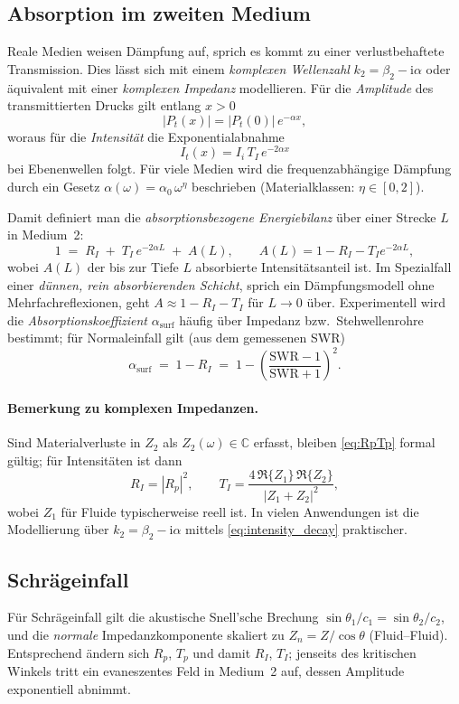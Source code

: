 \subsection{Absorption im zweiten Medium}
Reale Medien weisen Dämpfung auf, sprich es kommt zu einer verlustbehaftete Transmission.
Dies lässt sich mit einem \emph{komplexen Wellenzahl}
\(
    k_2 = \beta_2 - \mathrm{i}\alpha
\)
oder äquivalent mit einer \emph{komplexen Impedanz} modellieren.
Für die \emph{Amplitude} des transmittierten Drucks gilt entlang $x>0$
\[
    |P_t(x)| = |P_t(0)|\,e^{-\alpha x},
\]
woraus für die \emph{Intensität} die Exponentialabnahme
\begin{equation}
    I_t(x)=I_i\,T_I\,e^{-2\alpha x}
    \label{eq:intensity_decay}
\end{equation}
bei Ebenenwellen folgt.
Für viele Medien wird die frequenzabhängige Dämpfung durch ein Gesetz
$\alpha(\omega)=\alpha_0\,\omega^\eta$ beschrieben (Materialklassen: $\eta\in[0,2]$).
\cite{schall:allenAbsorption}

Damit definiert man die \emph{absorptionsbezogene Energiebilanz} über einer Strecke $L$ in Medium~2:
\begin{equation}
    1 \;=\; R_I \;+\; T_I\,e^{-2\alpha L} \;+\; A(L),
    \qquad
    A(L)=1-R_I - T_I e^{-2\alpha L},
    \label{eq:absorption_balance}
\end{equation}
wobei $A(L)$ der bis zur Tiefe $L$ absorbierte Intensitätsanteil ist.
Im Spezialfall einer \emph{dünnen, rein absorbierenden Schicht}, sprich ein Dämpfungs\-modell ohne Mehrfachreflexionen, geht $A \approx 1-R_I-T_I$ für $L\to0$ über.
Experimentell wird die \emph{Absorptionskoeffizient} $\alpha_\mathrm{surf}$ häufig über Impedanz\- bzw.\ Stehwellen\-rohre bestimmt; für Normal\-einfall gilt (aus dem gemessenen SWR)
\begin{equation}
    \alpha_\mathrm{surf} \;=\; 1 - R_I \;=\; 1 - \left(\frac{\mathrm{SWR}-1}{\mathrm{SWR}+1}\right)^2.
    \label{eq:alpha_SWR}
\end{equation}

\paragraph{Bemerkung zu komplexen Impedanzen.}
Sind Materialverluste in $Z_2$ als $Z_2(\omega)\in\mathbb{C}$ erfasst, bleiben \eqref{eq:RpTp} formal gültig; für Intensitäten ist dann
\[
    R_I=\left|R_p\right|^2,\qquad
    T_I=\frac{4\,\Re\{Z_1\}\,\Re\{Z_2\}}{|Z_1+Z_2|^2},
\]
wobei $Z_1$ für Fluide typischerweise reell ist.
In vielen Anwendungen ist die Modellierung über $k_2=\beta_2-\mathrm{i}\alpha$ mittels \eqref{eq:intensity_decay} praktischer.%
\cite{schall:kinsler,schall:allenRT}

\subsection{Schräg\-einfall}
Für Schräg\-einfall gilt die akustische Snell'sche Brechung
\(
    \sin\theta_1/c_1=\sin\theta_2/c_2
\),
und die \emph{normale} Impedanzkomponente skaliert zu $Z_{n} = Z/\cos\theta$ (Fluid--Fluid).
Entsprechend ändern sich $R_p$, $T_p$ und damit $R_I$, $T_I$; jenseits des kritischen Winkels tritt ein evaneszentes Feld in Medium~2 auf,
dessen Amplitude exponentiell abnimmt.
\cite{schall:wikiSnell}
